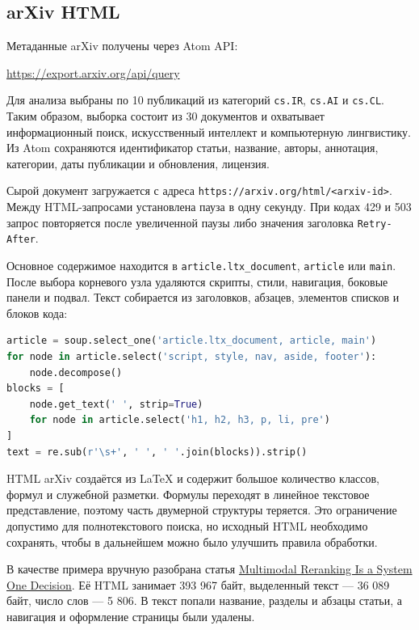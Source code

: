 \documentclass[pdf,unicode,12pt,a4paper,oneside,fleqn]{article}
\begin{document}
\subsection{arXiv HTML}

Метаданные arXiv получены через Atom API:

\begin{center}
\url{https://export.arxiv.org/api/query}
\end{center}

Для анализа выбраны по 10 публикаций из категорий \texttt{cs.IR},
\texttt{cs.AI} и \texttt{cs.CL}. Таким образом, выборка состоит из 30
документов и охватывает информационный поиск, искусственный интеллект и
компьютерную лингвистику. Из Atom сохраняются идентификатор статьи, название,
авторы, аннотация, категории, даты публикации и обновления, лицензия.

Сырой документ загружается с адреса
\texttt{https://arxiv.org/html/<arxiv-id>}. Между HTML-запросами установлена
пауза в одну секунду. При кодах 429 и 503 запрос повторяется после увеличенной
паузы либо значения заголовка \texttt{Retry-After}.

Основное содержимое находится в \texttt{article.ltx\_document},
\texttt{article} или \texttt{main}. После выбора корневого узла удаляются
скрипты, стили, навигация, боковые панели и подвал. Текст собирается из
заголовков, абзацев, элементов списков и блоков кода:

\begin{lstlisting}[language=Python]
article = soup.select_one('article.ltx_document, article, main')
for node in article.select('script, style, nav, aside, footer'):
    node.decompose()
blocks = [
    node.get_text(' ', strip=True)
    for node in article.select('h1, h2, h3, p, li, pre')
]
text = re.sub(r'\s+', ' ', ' '.join(blocks)).strip()
\end{lstlisting}

HTML arXiv создаётся из LaTeX и содержит большое количество классов, формул и
служебной разметки. Формулы переходят в линейное текстовое представление, поэтому
часть двумерной структуры теряется. Это ограничение допустимо для полнотекстового
поиска, но исходный HTML необходимо сохранять, чтобы в дальнейшем можно было
улучшить правила обработки.

В качестве примера вручную разобрана статья
\href{https://arxiv.org/html/2610.28435v1}{Multimodal Reranking Is a System One
Decision}. Её HTML занимает 393 967 байт, выделенный текст --- 36 089 байт,
число слов --- 5 806. В текст попали название, разделы и абзацы статьи, а
навигация и оформление страницы были удалены.
\end{document}

